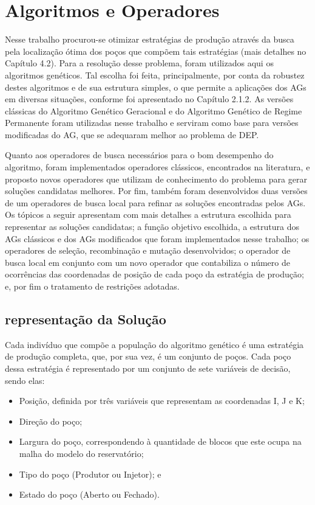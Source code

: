 \chapter{Algoritmos e Operadores}
\label{ch:ch3}
Nesse trabalho procurou-se otimizar estratégias de produção através da busca pela localização ótima dos poços que compõem tais estratégias (mais detalhes no Capítulo 4.2). Para a resolução desse problema, foram utilizados aqui os algoritmos genéticos. Tal escolha foi feita, principalmente, por conta da robustez destes algoritmos e de sua estrutura simples, o que permite a aplicações dos AGs em diversas situações, conforme foi apresentado no Capítulo 2.1.2. As versões clássicas do Algoritmo Genético Geracional e do Algoritmo Genético de Regime Permanente foram utilizadas nesse trabalho e serviram como base para versões modificadas do AG, que se adequaram melhor ao problema de DEP.

Quanto aos operadores de busca necessários para o bom desempenho do algoritmo, foram implementados operadores clássicos, encontrados na literatura, e proposto novos operadores que utilizam de conhecimento do problema para gerar soluções candidatas melhores. Por fim, também foram desenvolvidos duas versões de um operadores de busca local para refinar as soluções encontradas pelos AGs. Os tópicos a seguir apresentam com mais detalhes a estrutura escolhida para representar as soluções candidatas; a função objetivo escolhida, a estrutura dos AGs clássicos e dos AGs modificados que foram implementados nesse trabalho; os operadores de seleção, recombinação e mutação desenvolvidos; o operador de busca local em conjunto com um novo operador que contabiliza o número de ocorrências das coordenadas de posição de cada poço da estratégia de produção; e, por fim o tratamento de restrições adotadas.  

\section{representação da Solução}

Cada indivíduo que compõe a população do algoritmo genético é uma estratégia de produção completa, que, por sua vez, é um conjunto de poços. Cada poço dessa estratégia é representado por um conjunto de sete variáveis de decisão, sendo elas:

\begin{itemize}

\item Posição, definida por três variáveis que representam as coordenadas I, J e K;
\item Direção do poço;
\item Largura do poço, correspondendo à quantidade de blocos que este ocupa na malha do modelo do reservatório; 
\item Tipo do poço (Produtor ou Injetor); e
\item Estado do poço (Aberto ou Fechado).

\end{itemize}

